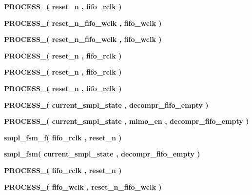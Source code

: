 \begin{DoxyCompactItemize}
\item 
{\bf P\+R\+O\+C\+E\+S\+S\+\_}{\bfseries  ( {\bfseries {\bfseries {\bf reset\+\_\+n}} \textcolor{vhdlchar}{ }} , {\bfseries {\bfseries {\bf fifo\+\_\+rclk}} \textcolor{vhdlchar}{ }} )}
\item 
{\bf P\+R\+O\+C\+E\+S\+S\+\_}{\bfseries  ( {\bfseries {\bfseries {\bf reset\+\_\+n\+\_\+fifo\+\_\+wclk}} \textcolor{vhdlchar}{ }} , {\bfseries {\bfseries {\bf fifo\+\_\+wclk}} \textcolor{vhdlchar}{ }} )}
\item 
{\bf P\+R\+O\+C\+E\+S\+S\+\_}{\bfseries  ( {\bfseries {\bfseries {\bf reset\+\_\+n\+\_\+fifo\+\_\+wclk}} \textcolor{vhdlchar}{ }} , {\bfseries {\bfseries {\bf fifo\+\_\+wclk}} \textcolor{vhdlchar}{ }} )}
\item 
{\bf P\+R\+O\+C\+E\+S\+S\+\_}{\bfseries  ( {\bfseries {\bfseries {\bf reset\+\_\+n}} \textcolor{vhdlchar}{ }} , {\bfseries {\bfseries {\bf fifo\+\_\+rclk}} \textcolor{vhdlchar}{ }} )}
\item 
{\bf P\+R\+O\+C\+E\+S\+S\+\_}{\bfseries  ( {\bfseries {\bfseries {\bf reset\+\_\+n}} \textcolor{vhdlchar}{ }} , {\bfseries {\bfseries {\bf fifo\+\_\+rclk}} \textcolor{vhdlchar}{ }} )}
\item 
{\bf P\+R\+O\+C\+E\+S\+S\+\_}{\bfseries  ( {\bfseries {\bfseries {\bf reset\+\_\+n}} \textcolor{vhdlchar}{ }} , {\bfseries {\bfseries {\bf fifo\+\_\+rclk}} \textcolor{vhdlchar}{ }} )}
\item 
{\bf P\+R\+O\+C\+E\+S\+S\+\_}{\bfseries  ( {\bfseries {\bfseries {\bf current\+\_\+smpl\+\_\+state}} \textcolor{vhdlchar}{ }} , {\bfseries {\bfseries {\bf decompr\+\_\+fifo\+\_\+empty}} \textcolor{vhdlchar}{ }} )}
\item 
{\bf P\+R\+O\+C\+E\+S\+S\+\_}{\bfseries  ( {\bfseries {\bfseries {\bf current\+\_\+smpl\+\_\+state}} \textcolor{vhdlchar}{ }} , {\bfseries {\bfseries {\bf mimo\+\_\+en}} \textcolor{vhdlchar}{ }} , {\bfseries {\bfseries {\bf decompr\+\_\+fifo\+\_\+empty}} \textcolor{vhdlchar}{ }} )}
\item 
{\bf smpl\+\_\+fsm\+\_\+f}{\bfseries  ( {\bfseries {\bfseries {\bf fifo\+\_\+rclk}} \textcolor{vhdlchar}{ }} , {\bfseries {\bfseries {\bf reset\+\_\+n}} \textcolor{vhdlchar}{ }} )}
\item 
{\bf smpl\+\_\+fsm}{\bfseries  ( {\bfseries {\bfseries {\bf current\+\_\+smpl\+\_\+state}} \textcolor{vhdlchar}{ }} , {\bfseries {\bfseries {\bf decompr\+\_\+fifo\+\_\+empty}} \textcolor{vhdlchar}{ }} )}
\item 
{\bf P\+R\+O\+C\+E\+S\+S\+\_}{\bfseries  ( {\bfseries {\bfseries {\bf fifo\+\_\+rclk}} \textcolor{vhdlchar}{ }} , {\bfseries {\bfseries {\bf reset\+\_\+n}} \textcolor{vhdlchar}{ }} )}
\item 
{\bf P\+R\+O\+C\+E\+S\+S\+\_}{\bfseries  ( {\bfseries {\bfseries {\bf fifo\+\_\+wclk}} \textcolor{vhdlchar}{ }} , {\bfseries {\bfseries {\bf reset\+\_\+n\+\_\+fifo\+\_\+wclk}} \textcolor{vhdlchar}{ }} )}
\end{DoxyCompactItemize}
